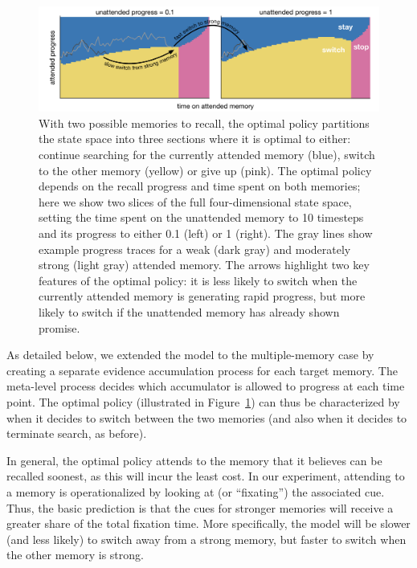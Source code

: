 \begin{figure}[t!]
  \centering
  \includegraphics[width=\textwidth]{figs/memory/exp2_predictions.pdf}
  \caption{ With two possible memories to recall, the optimal policy partitions the state space into three sections where it is optimal to either: continue searching for the currently attended memory (blue), switch to the other memory (yellow) or give up (pink). The optimal policy depends on the recall progress and time spent on both memories; here we show two slices of the full four-dimensional state space, setting the time spent on the unattended memory to 10 timesteps and its progress to either 0.1 (left) or 1 (right). The gray lines show example progress traces for a weak (dark gray) and moderately strong (light gray) attended memory. The arrows highlight two key features of the optimal policy: it is less likely to switch when the currently attended memory is generating rapid progress, but more likely to switch if the unattended memory has already shown promise.}
  \label{fig:exp2_predictions}
\end{figure}

As detailed below, we extended the model to the multiple-memory case by creating a separate evidence accumulation process for each target memory. The meta-level process decides which accumulator is allowed to progress at each time point. The optimal policy (illustrated in Figure~\ref{fig:exp2_predictions}) can thus be characterized by when it decides to switch between the two memories (and also when it decides to terminate search, as before). 

In general, the optimal policy attends to the memory that it believes can be recalled soonest, as this will incur the least cost. In our experiment, attending to a memory is operationalized by looking at (or ``fixating'') the associated cue. Thus, the basic prediction is that the cues for stronger memories will receive a greater share of the total fixation time. More specifically, the model will be slower (and less likely) to switch away from a strong memory, but faster to switch when the other memory is strong.


